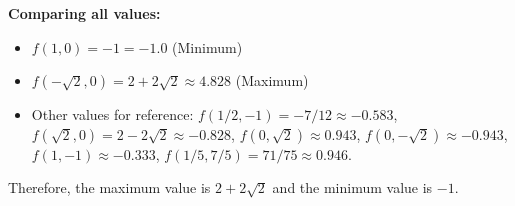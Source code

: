 \documentclass{article}
\begin{document}
\begin{enumerate}[label=\fbox{\arabic*}]
        \textbf{Comparing all values:}
        \begin{itemize}
          \item $f(1, 0) = -1 = -1.0$ (Minimum)
          \item $f(-\sqrt{2}, 0) = 2 + 2\sqrt{2} \approx 4.828$ (Maximum)
          \item Other values for reference: $f(1/2, -1) = -7/12 \approx -0.583$, $f(\sqrt{2}, 0) = 2 - 2\sqrt{2} \approx -0.828$, $f(0, \sqrt{2}) \approx 0.943$, $f(0, -\sqrt{2}) \approx -0.943$, $f(1, -1) \approx -0.333$, $f(1/5, 7/5) = 71/75 \approx 0.946$.
        \end{itemize}
        Therefore, the maximum value is $2 + 2\sqrt{2}$ and the minimum value is $-1$.

\end{enumerate}
\end{document}
